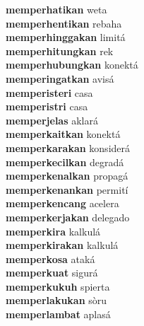 \textbf{memperhatikan } weta \\
\textbf{memperhentikan } rebaha \\
\textbf{memperhinggakan } limitá \\
\textbf{memperhitungkan } rek \\
\textbf{memperhubungkan } konektá \\
\textbf{memperingatkan } avisá \\
\textbf{memperisteri } casa \\
\textbf{memperistri } casa \\
\textbf{memperjelas } aklará \\
\textbf{memperkaitkan } konektá \\
\textbf{memperkarakan } konsiderá \\
\textbf{memperkecilkan } degradá \\
\textbf{memperkenalkan } propagá \\
\textbf{memperkenankan } permití \\
\textbf{memperkencang } acelera \\
\textbf{memperkerjakan } delegado \\
\textbf{memperkira } kalkulá \\
\textbf{memperkirakan } kalkulá \\
\textbf{memperkosa } ataká \\
\textbf{memperkuat } sigurá \\
\textbf{memperkukuh } spierta \\
\textbf{memperlakukan } sòru \\
\textbf{memperlambat } aplasá \\

